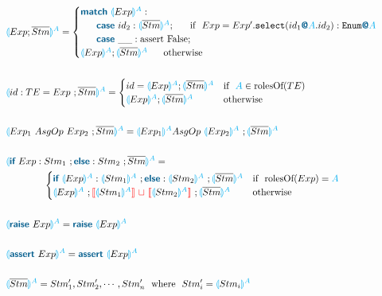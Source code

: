\documentclass{thesis}
\newcommand{\projection}[2]{{\color{cyan}\llparenthesis}#1{\color{cyan}\rrparenthesis^#2}}
\newcommand{\mblue}[1]{\textbf{\textsf{\color{MidnightBlue}#1}}}
\newcommand{\cyan}[1]{\color{cyan}#1}
\newcommand{\nl}[1]{{\color{red}{\llbracket}}#1{\color{red}{\rrbracket}}} %
\newcommand{\mg}{~{\color{red}{\sqcup}}~} %
\begin{document}
\begin{alignat*}{2}
  \\
  &&&\projection{Exp;\overline{Stm}}{A} =
  \begin{cases}
    \mblue{match} ~\projection{Exp}{A}: \\
    ~~~~~\mblue{case} ~id_2: \projection{\overline{Stm}}{A};~~~~~ \text{if}~~Exp = Exp'.\texttt{select}(id_1\mblue{@}{\cyan{A}}.id_2):\texttt{Enum}\mblue{@}{\cyan{A}}\\ %
    ~~~~~\mblue{case} ~\_\_: \text{assert False}; \\
    \projection{Exp}{A};\projection{\overline{Stm}}{A} ~~~~~ \text{otherwise}\\
  \end{cases}\\
  \\
  &&& \projection{id:TE = Exp~;\overline{Stm}}{A} =
  \begin{cases}
    id = \projection{Exp}{A};\projection{\overline{Stm}}{A} & \text{if}~~ {\color{cyan}A} \in \text{rolesOf}(TE)\\
    \projection{Exp}{A};\projection{\overline{Stm}}{A} & \text{otherwise}
  \end{cases}\\
  \\
  &&& \projection{Exp_1 ~AsgOp~ Exp_2 ~; \overline{Stm}}{A} = \projection{Exp_1}{A} AsgOp~ \projection{Exp_2}{A} ~; \projection{\overline{Stm}}{A} \\
  \\
  &&&\projection{\mblue{if}~Exp:Stm_1~;\mblue{else}:Stm_2 ~;\overline{Stm}}{A}=\\
  &&&
  ~~~~~~~~~~~~\begin{cases}
    \mblue{if}~\projection{Exp}{A} : \projection{Stm_1}{A} ~; \mblue{else}:\projection{Stm_2}{A} ~;\projection{\overline{Stm}}{A} & \text{if}~~ \text{rolesOf}(Exp) = \cyan{A}\\
    \projection{Exp}{A} ~; \nl{\projection{Stm_1}{A}} \mg \nl{\projection{Stm_2}{A}} ~;\projection{\overline{Stm}}{A} & \text{otherwise}
  \end{cases}\\
  \\
  &&&\projection{\mblue{raise}~Exp}{A} = \mblue{raise}~\projection{Exp}{A}\\
  \\
  &&&\projection{\mblue{assert}~Exp}{A} = \mblue{assert}~\projection{Exp}{A}\\
  \\
  &&&\projection{\overline{Stm}}{A} = Stm'_1,Stm'_2,\cdots,Stm'_n ~~\text{where}~~ Stm'_i = \projection{Stm_i}{A}\\  
\end{alignat*}
\end{document}
